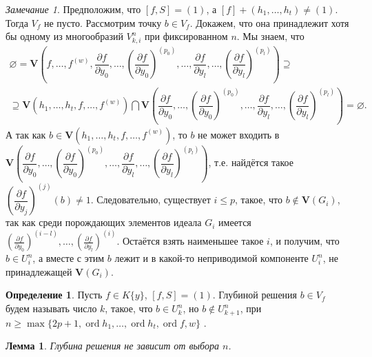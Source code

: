 \documentclass[16pt]{article}
\DeclareMathOperator{\ord}{ord}
\renewcommand{\le}{\leqslant} %
\renewcommand{\ge}{\geqslant} %
\theoremstyle{plain1}
\newtheorem{lemma}[theorem1]{Лемма}
\theoremstyle{plain2}
\theoremstyle{plain}
\theoremstyle{plain3}
\theoremstyle{definition}
\newtheorem{definition}[theorem2]{Определение}
\theoremstyle{remark}
\newtheorem{remark}[theorem1]{Замечание}
\begin{document}
\begin{remark}\label{remark:o_prinadleznosti_reshenia}
Предположим, что $[f,S]=(1)$, а $[f]+(h_1,\ldots,h_t)\neq (1)$. Тогда ${V}_{f}$ не пусто. Рассмотрим точку $b\in{V}_{f}$. Докажем, что она принадлежит хотя бы одному из многообразий ${V}_{k,i}^n$ при фиксированном $n$. Мы знаем, что 
\begin{gather*}
\varnothing=\mathbf{V}\left(f,\ldots,f^{(w)},\dfrac{\partial f}{\partial y_0},\ldots,(\dfrac{\partial f}{\partial y_0})^{(p_0)},\ldots, \dfrac{\partial f}{\partial y_l},\ldots,(\dfrac{\partial f}{\partial y_l})^{(p_l)}\right)\supseteq \\
\supseteq \mathbf{V}\left(h_1,\ldots,h_t,f,\ldots,f^{(w)}\right)\bigcap\mathbf{V}\left(\dfrac{\partial f}{\partial y_0},\ldots,(\dfrac{\partial f}{\partial y_0})^{(p_0)},\ldots, \dfrac{\partial f}{\partial y_l},\ldots,(\dfrac{\partial f}{\partial y_l})^{(p_l)}\right)=\varnothing.
\end{gather*}
 А так как $b\in \mathbf{V}\left(h_1,\ldots,h_t,f,\ldots,f^{(w)}\right)$, то $b$ не может входить в $\mathbf{V}\left(\dfrac{\partial f}{\partial y_0},\ldots,(\dfrac{\partial f}{\partial y_0})^{(p_0)},\ldots, \dfrac{\partial f}{\partial y_l},\ldots,(\dfrac{\partial f}{\partial y_l})^{(p_l)}\right)$, т.е. найдётся такое $(\dfrac{\partial f}{\partial y_j})^{(j)}(b)\ne 1$.  Следовательно, существует $i\le p$, такое, что $b \not\in \mathbf{V}(G_i)$, так как среди порождающих элементов идеала $G_i$ имеется $\left(\frac{\partial f}{\partial y_0}\right)^{(i-l)},\ldots ,\left(\frac{\partial f}{\partial y_l}\right)^{(i)} $. Остаётся взять наименьшее такое $i$, и получим, что $b\in {U}_{i}^n$, а вместе с этим $b$ лежит и в какой-то неприводимой компоненте ${U}_{i}^n$, не принадлежащей $\mathbf{V}(G_{i})$.
\end{remark}

\begin{definition}
Пусть $f\in K\{y\}$, $[f,S]=(1)$.  Глубиной решения $b\in {V}_f$  будем называть число $k$, такое, что $b\in {U}_k^n$, но $b\not\in {U}_{k+1}^n$, при $n \ge\max\{ 2p+1,\ord{h_1},\ldots,\ord{h_t},\ord{f},w\}$ .
\end{definition}



\begin{lemma}\label{lemma:o_nasledovanii}
Глубина решения не зависит от выбора $n$.

\end{lemma}
\end{document}
